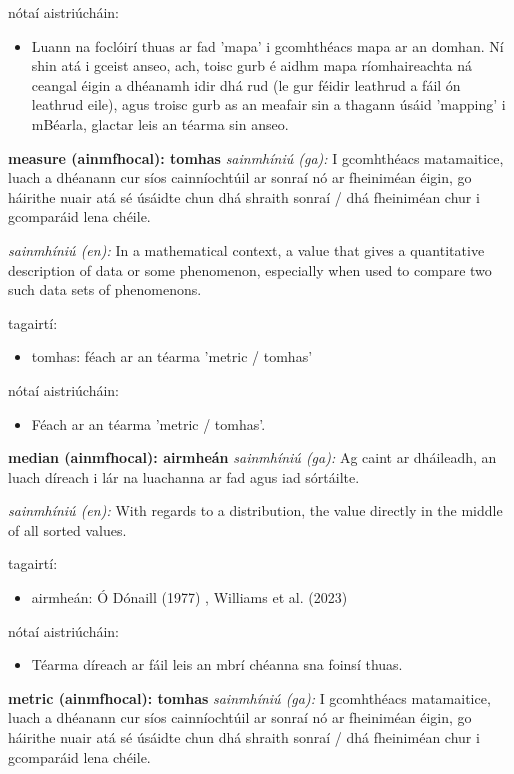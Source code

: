 \documentclass{article}
\begin{document}
nótaí aistriúcháin:
\begin{itemize}
	\item Luann na foclóirí thuas ar fad 'mapa' i gcomhthéacs mapa ar an domhan. Ní shin atá i gceist anseo, ach, toisc gurb é aidhm mapa ríomhaireachta ná ceangal éigin a dhéanamh idir dhá rud (le gur féidir leathrud a fáil ón leathrud eile), agus troisc gurb as an meafair sin a thagann úsáid 'mapping' i mBéarla, glactar leis an téarma sin anseo.
\end{itemize}


\textbf{measure (ainmfhocal): tomhas}
\textit{sainmhíniú (ga):} I gcomhthéacs matamaitice, luach a dhéanann cur síos cainníochtúil ar sonraí nó ar fheiniméan éigin, go háirithe nuair atá sé úsáidte chun dhá shraith sonraí / dhá fheiniméan chur i gcomparáid lena chéile.

\textit{sainmhíniú (en):} In a mathematical context, a value that gives a quantitative description of data or some phenomenon, especially when used to compare two such data sets of phenomenons.

tagairtí:
\begin{itemize}
	\item tomhas: féach ar an téarma 'metric / tomhas'
\end{itemize}

nótaí aistriúcháin:
\begin{itemize}
	\item Féach ar an téarma 'metric / tomhas'.
\end{itemize}


\textbf{median (ainmfhocal): airmheán}
\textit{sainmhíniú (ga):} Ag caint ar dháileadh, an luach díreach i lár na luachanna ar fad agus iad sórtáilte.

\textit{sainmhíniú (en):} With regards to a distribution, the value directly in the middle of all sorted values.

tagairtí:
\begin{itemize}
	\item airmheán: Ó Dónaill (1977) \cite{odonaill}, Williams et al. (2023) \cite{storchiste}
\end{itemize}

nótaí aistriúcháin:
\begin{itemize}
	\item Téarma díreach ar fáil leis an mbrí chéanna sna foinsí thuas.
\end{itemize}


\textbf{metric (ainmfhocal): tomhas}
\textit{sainmhíniú (ga):} I gcomhthéacs matamaitice, luach a dhéanann cur síos cainníochtúil ar sonraí nó ar fheiniméan éigin, go háirithe nuair atá sé úsáidte chun dhá shraith sonraí / dhá fheiniméan chur i gcomparáid lena chéile.
\end{document}
